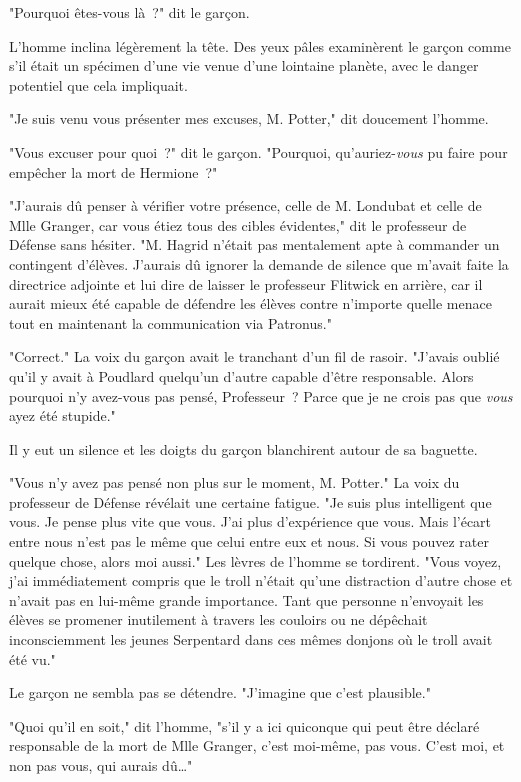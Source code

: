 "Pourquoi êtes-vous là~?" dit le garçon.

L'homme inclina légèrement la tête. Des yeux pâles examinèrent le garçon comme s'il était un spécimen d'une vie venue d'une lointaine planète, avec le danger potentiel que cela impliquait.

"Je suis venu vous présenter mes excuses, M. Potter," dit doucement l'homme.

"Vous excuser pour quoi~?" dit le garçon. "Pourquoi, qu'auriez-\emph{vous} pu faire pour empêcher la mort de Hermione~?"

"J'aurais dû penser à vérifier votre présence, celle de M. Londubat et celle de Mlle Granger, car vous étiez tous des cibles évidentes," dit le professeur de Défense sans hésiter. "M. Hagrid n'était pas mentalement apte à commander un contingent d'élèves. J'aurais dû ignorer la demande de silence que m'avait faite la directrice adjointe et lui dire de laisser le professeur Flitwick en arrière, car il aurait mieux été capable de défendre les élèves contre n'importe quelle menace tout en maintenant la communication via Patronus."

"Correct." La voix du garçon avait le tranchant d'un fil de rasoir. "J'avais oublié qu'il y avait à Poudlard quelqu'un d'autre capable d'être responsable. Alors pourquoi n'y avez-vous pas pensé, Professeur~? Parce que je ne crois pas que \emph{vous} ayez été stupide."

Il y eut un silence et les doigts du garçon blanchirent autour de sa baguette.

"Vous n'y avez pas pensé non plus sur le moment, M. Potter." La voix du professeur de Défense révélait une certaine fatigue. "Je suis plus intelligent que vous. Je pense plus vite que vous. J'ai plus d'expérience que vous. Mais l'écart entre nous n'est pas le même que celui entre eux et nous. Si vous pouvez rater quelque chose, alors moi aussi." Les lèvres de l'homme se tordirent. "Vous voyez, j'ai immédiatement compris que le troll n'était qu'une distraction d'autre chose et n'avait pas en lui-même grande importance. Tant que personne n'envoyait les élèves se promener inutilement à travers les couloirs ou ne dépêchait inconsciemment les jeunes Serpentard dans ces mêmes donjons où le troll avait été vu."

Le garçon ne sembla pas se détendre. "J'imagine que c'est plausible."

"Quoi qu'il en soit," dit l'homme, "s'il y a ici quiconque qui peut être déclaré responsable de la mort de Mlle Granger, c'est moi-même, pas vous. C'est moi, et non pas vous, qui aurais dû…"

